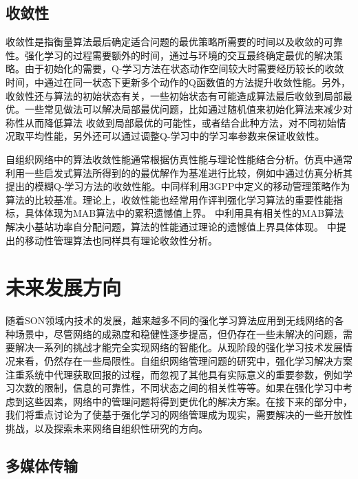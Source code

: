﻿\documentclass[11pt,draftclsnofoot,onecolumn,journal,letterpaper]{IEEEtran}
\begin{document}
\subsection{收敛性}
收敛性是指衡量算法最后确定适合问题的最优策略所需要的时间以及收敛的可靠性。强化学习的过程需要额外的时间，通过与环境的交互最终确定最优的解决策略。由于初始化的需要，Q-学习方法在状态动作空间较大时需要经历较长的收敛时间，\cite{Simsek2011}中通过在同一状态下更新多个动作的Q函数值的方法提升收敛性能。另外，收敛性还与算法的初始状态有关，一些初始状态有可能造成算法最后收敛到局部最优。一些常见做法可以解决局部最优问题，比如通过随机值来初始化算法来减少对称性从而降低算法 收敛到局部最优的可能性，或者结合此种方法，对不同初始情况取平均性能，另外还可以通过调整Q-学习中的学习率参数来保证收敛性。

自组织网络中的算法收敛性能通常根据仿真性能与理论性能结合分析。仿真中通常利用一些启发式算法所得到的的最优解作为基准进行比较，例如\cite{Razavi2010a}中通过仿真分析其提出的模糊Q-学习方法的收敛性能。\cite{Simsek2015a}中同样利用3GPP中定义的移动管理策略作为算法的比较基准。理论上，收敛性能也经常用作评判强化学习算法的重要性能指标，具体体现为MAB算法中的累积遗憾值上界。\cite{Wang2017} 中利用具有相关性的MAB算法解决小基站功率自分配问题，算法的性能通过理论的遗憾值上界具体体现。\cite{Shen2016} 中提出的移动性管理算法也同样具有理论收敛性分析。

\section{未来发展方向}
\label{sec:FutureWork}


随着SON领域内技术的发展，越来越多不同的强化学习算法应用到无线网络的各种场景中，尽管网络的成熟度和稳健性逐步提高，但仍存在一些未解决的问题，需要解决一系列的挑战才能完全实现网络的智能化。从现阶段的强化学习技术发展情况来看，仍然存在一些局限性。自组织网络管理问题的研究中，强化学习解决方案注重系统中代理获取回报的过程，而忽视了其他具有实际意义的重要参数，例如学习次数的限制，信息的可靠性，不同状态之间的相关性等等。如果在强化学习中考虑到这些因素，网络中的管理问题将得到更优化的解决方案。在接下来的部分中，我们将重点讨论为了使基于强化学习的网络管理成为现实，需要解决的一些开放性挑战，以及探索未来网络自组织性研究的方向。

\subsection{多媒体传输}
\end{document}
